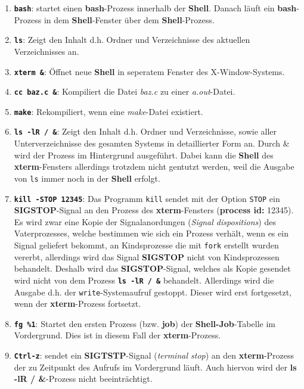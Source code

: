 \documentclass{ti2}
\begin{document}
\begin{enumerate}
	\item \texttt{\textbf{bash}}: startet einen \textbf{bash}-Prozess innerhalb der \textbf{Shell}. Danach läuft ein \textbf{bash}-Prozess in dem \textbf{Shell}-Fenster über dem \textbf{Shell}-Prozess.
	\item \texttt{\textbf{ls}}: Zeigt den Inhalt d.h. Ordner und Verzeichnisse des aktuellen Verzeichnisses an.
	\item \texttt{\textbf{xterm \&}}: Öffnet neue \textbf{Shell} in seperatem Fenster des X-Window-Systems.
	\item \texttt{\textbf{cc baz.c \&}}: Kompiliert die Datei \textit{baz.c} zu einer \textit{a.out}-Datei.
	\item \texttt{\textbf{make}}: Rekompiliert, wenn eine \textit{make}-Datei existiert.
	\item \texttt{\textbf{ls -lR / \&}}: Zeigt den Inhalt d.h. Ordner und Verzeichnisse, sowie aller Unterverzeichnisse des gesamten Systems in detaillierter Form an. Durch \& wird der Prozess im Hintergrund ausgeführt. Dabei kann die \textbf{Shell} des \textbf{xterm}-Fensters allerdings trotzdem nicht gentutzt werden, weil die Ausgabe von \texttt{ls} immer noch in der \textbf{Shell} erfolgt.
	\item \texttt{\textbf{kill -STOP 12345}}: Das Programm \texttt{kill} sendet mit der Option \texttt{STOP} ein \textbf{SIGSTOP}-Signal an den Prozess des \textbf{xterm}-Fensters (\textbf{process id:} 12345). Es wird zwar eine Kopie der Signalanordungen (\textit{Signal dispositions}) des Vaterprozesses, welche bestimmen wie sich ein Prozess verhält, wenn es ein Signal geliefert bekommt, an Kindsprozesse die mit \texttt{fork} erstellt wurden vererbt, allerdings wird das Signal \textbf{SIGSTOP} nicht von Kindsprozessen behandelt. Deshalb wird das \textbf{SIGSTOP}-Signal, welches als Kopie gesendet wird nicht von dem Prozess \texttt{\textbf{ls -lR / \&}} behandelt. Allerdings wird die Ausgabe d.h. der \texttt{write}-Systemaufruf gestoppt. Dieser wird erst fortgesetzt, wenn der \textbf{xterm}-Prozess fortsetzt.
	\item \texttt{\textbf{fg \%1}}: Startet den ersten Prozess (bzw. \textbf{job}) der \textbf{Shell-Job}-Tabelle im Vordergrund. Dies ist in diesem Fall der \textbf{xterm}-Prozess.
	\item \texttt{\textbf{Ctrl-z}}: sendet ein \textbf{SIGTSTP}-Signal (\textit{terminal stop}) an den \textbf{xterm}-Prozess der zu Zeitpunkt des Aufrufs im Vordergrund läuft. Auch hiervon wird der \textbf{ls -lR / \&}-Prozess nicht beeinträchtigt.

\end{enumerate}
\end{document}
